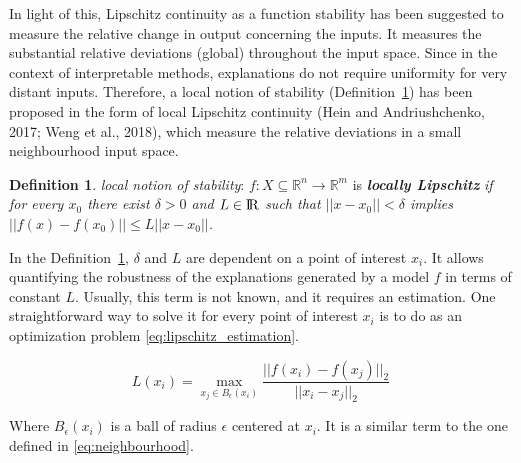 \documentclass[english]{tktltiki2}
\theoremstyle{definition}
\newtheorem{definition}[thm]{Definition}
\theoremstyle{remark}
\begin{document}
In light of this, Lipschitz continuity as a function stability has been suggested to measure the relative change in output concerning the inputs. It measures the substantial relative deviations (global) throughout the input space. Since in the context of interpretable methods, explanations do not require uniformity for very distant inputs. Therefore, a local notion of stability (Definition~\ref{def:3}) has been proposed in the form of local Lipschitz continuity (Hein and Andriushchenko, 2017; Weng et al., 2018), which measure the relative deviations in a small neighbourhood input space.
\begin{definition}\label{def:3}{\textit{local notion of stability}:}
	$f: X \subseteq {\mathbb{R}}^n \rightarrow {\mathbb{R}}^m$ is \textbf{\textit{locally Lipschitz}} \textit{if for every $x_0$ there exist $\delta > 0$ and $L \in {\rm I\!R}$ such that $||x - x_0|| < \delta$ implies $||f(x) - f(x_0)|| \leq L||x - x_0||$.}
\end{definition}

In the Definition~\ref{def:3}, $\delta$ and $L$ are dependent on a point of interest $x_i$. It allows quantifying the robustness of the explanations generated by a model $f$ in terms of constant $L$. Usually, this term is not known, and it requires an estimation. One straightforward way to solve it for every point of interest $x_i$ is to do as an optimization problem \eqref{eq:lipschitz_estimation}.


\begin{equation}\label{eq:lipschitz_estimation}
L(x_i) = \operatorname*{max}_{x_j \in B_{\epsilon}(x_i)}  \frac{||f(x_i) - f(x_j)||_{2}}{||x_i - x_j||_{2}}
\end{equation}

Where $B_{\epsilon}(x_{i})$ is a ball of radius $\epsilon$ centered at $x_i$. It is a similar term to the one defined in \eqref{eq:neighbourhood}. 
\end{document}
